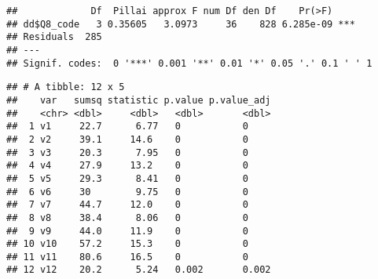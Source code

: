 \documentclass[]{article}
\newenvironment{Shaded}{\begin{snugshade}}{\end{snugshade}}
\newcommand{\KeywordTok}[1]{\textcolor[rgb]{0.13,0.29,0.53}{\textbf{#1}}}
\newcommand{\DataTypeTok}[1]{\textcolor[rgb]{0.13,0.29,0.53}{#1}}
\newcommand{\DecValTok}[1]{\textcolor[rgb]{0.00,0.00,0.81}{#1}}
\newcommand{\StringTok}[1]{\textcolor[rgb]{0.31,0.60,0.02}{#1}}
\newcommand{\OperatorTok}[1]{\textcolor[rgb]{0.81,0.36,0.00}{\textbf{#1}}}
\newcommand{\NormalTok}[1]{#1}
\begin{document}
\begin{verbatim}
##             Df  Pillai approx F num Df den Df    Pr(>F)    
## dd$Q8_code   3 0.35605   3.0973     36    828 6.285e-09 ***
## Residuals  285                                             
## ---
## Signif. codes:  0 '***' 0.001 '**' 0.01 '*' 0.05 '.' 0.1 ' ' 1
\end{verbatim}

\begin{Shaded}
\end{Shaded}

\begin{verbatim}
## # A tibble: 12 x 5
##    var   sumsq statistic p.value p.value_adj
##    <chr> <dbl>     <dbl>   <dbl>       <dbl>
##  1 v1     22.7      6.77   0           0    
##  2 v2     39.1     14.6    0           0    
##  3 v3     20.3      7.95   0           0    
##  4 v4     27.9     13.2    0           0    
##  5 v5     29.3      8.41   0           0    
##  6 v6     30        9.75   0           0    
##  7 v7     44.7     12.0    0           0    
##  8 v8     38.4      8.06   0           0    
##  9 v9     44.0     11.9    0           0    
## 10 v10    57.2     15.3    0           0    
## 11 v11    80.6     16.5    0           0    
## 12 v12    20.2      5.24   0.002       0.002
\end{verbatim}
\end{document}
